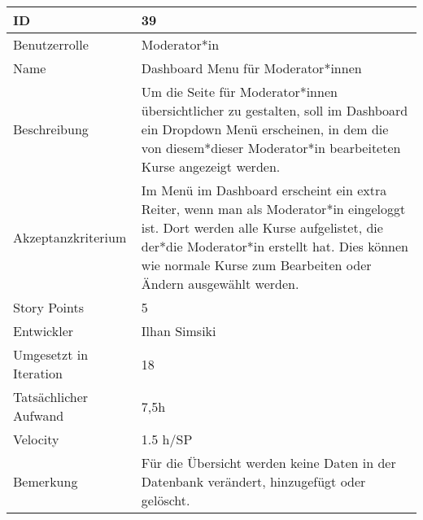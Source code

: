 \begin{tabularx}{\textwidth}{|p{}|X|}
	\hline
	ID & 39 \\
	\hline
	Benutzerrolle & Moderator*in \\
	\hline
	Name & Dashboard Menu für Moderator*innen\\
	\hline
	Beschreibung & Um die Seite für Moderator*innen übersichtlicher zu gestalten, soll im Dashboard ein Dropdown Menü erscheinen, in dem die von diesem*dieser Moderator*in bearbeiteten Kurse angezeigt werden. \\
	\hline
	Akzeptanzkriterium & Im Menü im Dashboard erscheint ein extra Reiter, wenn man als Moderator*in eingeloggt ist. Dort werden alle Kurse aufgelistet, die der*die Moderator*in erstellt hat. Dies können wie normale Kurse zum Bearbeiten oder Ändern ausgewählt werden. \\
	\hline
	Story Points & 5\\
	\hline
	Entwickler & Ilhan Simsiki\\
	\hline
	Umgesetzt in Iteration & 18\\
	\hline
	Tatsächlicher Aufwand & 7,5h \\
	\hline
	Velocity & 1.5 h/SP\\
	\hline
	Bemerkung & Für die Übersicht werden keine Daten in der Datenbank verändert, hinzugefügt oder gelöscht.\\
	\hline
\end{tabularx}
\vspace{20pt}
